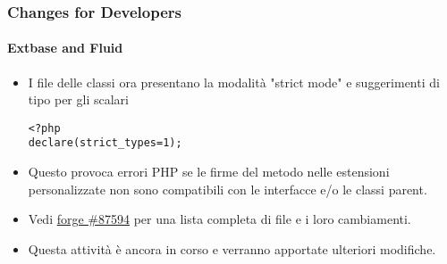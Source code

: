 \begin{frame}[fragile]
	\frametitle{Changes for Developers}
	\framesubtitle{Extbase and Fluid}

	\lstset{basicstyle=\smaller\ttfamily}

	\begin{itemize}
		\item I file delle classi ora presentano la modalità "strict mode" e suggerimenti di tipo per gli scalari

\begin{lstlisting}
<?php
declare(strict_types=1);
\end{lstlisting}

		\item Questo provoca errori PHP se le firme del metodo nelle estensioni personalizzate
		    non sono compatibili con le interfacce e/o le classi parent.

		\item Vedi \href{https://forge.typo3.org/issues/87594}{forge \#87594}
			per una lista completa di file e i loro cambiamenti.

		\item Questa attività è ancora in corso e verranno apportate ulteriori modifiche.

	\end{itemize}

\end{frame}


